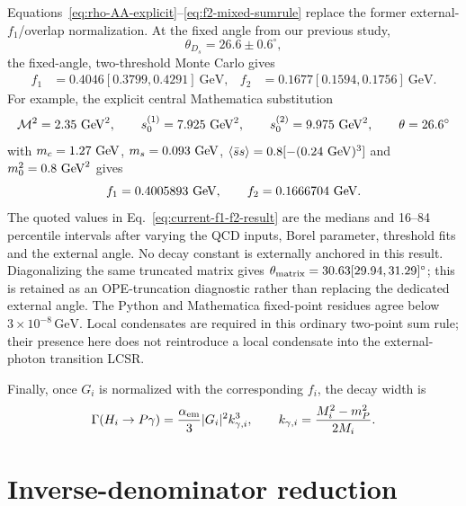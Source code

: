 \documentclass[11pt]{article}
\begin{document}
Equations~\eqref{eq:rho-AA-explicit}--\eqref{eq:f2-mixed-sumrule}
replace the former external-$f_1$/overlap normalization.  At the fixed angle
from our previous study,
\begin{equation}
 \theta_{D_s}=26.6\pm0.6^\circ,
\end{equation}
the fixed-angle, two-threshold Monte Carlo gives
\begin{align}
 f_1&=0.4046[0.3799,0.4291]~\mathrm{GeV},&
 f_2&=0.1677[0.1594,0.1756]~\mathrm{GeV}.
 \label{eq:current-f1-f2-result}
\end{align}
For example, the explicit central Mathematica substitution
\begin{equation}
 \mathcal M^2=2.35~{\rm GeV}^2,\qquad
 s_0^{(1)}=7.925~{\rm GeV}^2,\qquad
 s_0^{(2)}=9.975~{\rm GeV}^2,\qquad
 \theta=26.6^\circ
\end{equation}
with $m_c=1.27~{\rm GeV}$, $m_s=0.093~{\rm GeV}$,
$\langle\bar ss\rangle=0.8[-(0.24~{\rm GeV})^3]$ and
$m_0^2=0.8~{\rm GeV}^2$ gives
\begin{equation}
 f_1=0.4005893~{\rm GeV},\qquad
 f_2=0.1666704~{\rm GeV}.
 \label{eq:central-f1-f2-explicit}
\end{equation}
The quoted values in Eq.~\eqref{eq:current-f1-f2-result} are the medians and
16--84 percentile intervals after varying the QCD inputs, Borel parameter,
threshold fits and the external angle.
No decay constant is externally anchored in this result.  Diagonalizing the
same truncated matrix gives
$\theta_{\rm matrix}=30.63[29.94,31.29]^\circ$; this is retained as an
OPE-truncation diagnostic rather than replacing the dedicated external angle.
The Python and Mathematica fixed-point residues agree below
$3\times10^{-8}\,\mathrm{GeV}$.  Local condensates are required in this
ordinary two-point sum rule; their presence here does not reintroduce a local
condensate into the external-photon transition LCSR.

Finally, once $G_i$ is normalized with the corresponding $f_i$, the decay
width is
\begin{equation}
  \Gamma(H_i\to P\gamma)
  =\frac{\alpha_{\rm em}}{3}|G_i|^2k_{\gamma,i}^3,
  \qquad
  k_{\gamma,i}=\frac{M_i^2-m_P^2}{2M_i}.
  \label{eq:mixed-radiative-width}
\end{equation}

\section{Inverse-denominator reduction}
\end{document}
